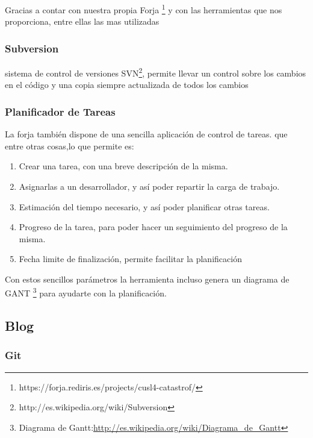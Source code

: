 Gracias a contar con nuestra propia Forja
\footnote{https://forja.rediris.es/projects/cusl4-catastrof/} y con las
herramientas que nos proporciona, entre ellas las mas utilizadas 
\subsubsection*{Subversion}
sistema de control de versiones
SVN\footnote{http://es.wikipedia.org/wiki/Subversion}, permite llevar un
control sobre los cambios en el código y una copia siempre actualizada de
todos los cambios
\subsubsection*{Planificador de Tareas}
La forja también dispone de una sencilla aplicación de control de tareas.
que entre otras cosas,lo que permite es:
\begin{enumerate}
 \item Crear una tarea, con una breve descripción de la misma.
 \item Asignarlas a un desarrollador, y así poder repartir la carga de trabajo.
 \item Estimación del tiempo necesario, y así poder planificar otras tareas.
 \item Progreso de la tarea, para poder hacer un seguimiento del progreso de la
misma.
 \item Fecha limite de finalización, permite facilitar la planificación
\end{enumerate}
Con estos sencillos parámetros la herramienta incluso genera un diagrama de
GANT
\footnote{Diagrama de
Gantt:\url{http://es.wikipedia.org/wiki/Diagrama_de_Gantt}} para ayudarte con
la planificación.

\subsection*{Blog}

\subsubsection*{Git}
